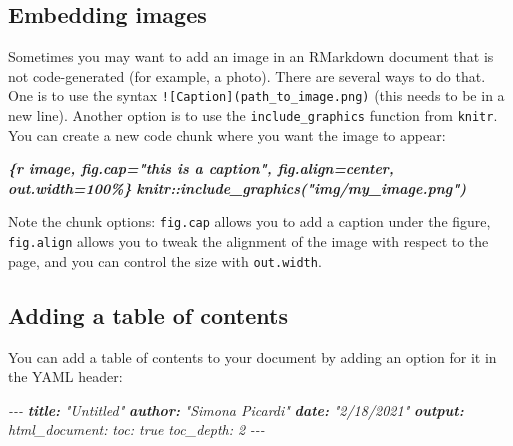 \documentclass[
]{book}
\newenvironment{Shaded}{\begin{snugshade}}{\end{snugshade}}
\newcommand{\AnnotationTok}[1]{\textcolor[rgb]{0.56,0.35,0.01}{\textbf{\textit{#1}}}}
\newcommand{\CommentTok}[1]{\textcolor[rgb]{0.56,0.35,0.01}{\textit{#1}}}
\newcommand{\InformationTok}[1]{\textcolor[rgb]{0.56,0.35,0.01}{\textbf{\textit{#1}}}}
\begin{document}
\hypertarget{embedding-images}{%
\subsection{Embedding images}\label{embedding-images}}

Sometimes you may want to add an image in an RMarkdown document that is not
code-generated (for example, a photo). There are several ways to do that. One is
to use the syntax \texttt{!{[}Caption{]}(path\_to\_image.png)} (this needs to be in a
new line). Another option is to use the \texttt{include\_graphics} function from \texttt{knitr}.
You can create a new code chunk where you want the image to appear:

\begin{Shaded}
\begin{Highlighting}[]
\InformationTok{\textasciigrave{}\textasciigrave{}\textasciigrave{}\{r image, fig.cap="this is a caption", fig.align=\textquotesingle{}center\textquotesingle{}, out.width=\textquotesingle{}100\%\textquotesingle{}\}}
\InformationTok{knitr::include\_graphics("img/my\_image.png")}
\InformationTok{\textasciigrave{}\textasciigrave{}\textasciigrave{}}
\end{Highlighting}
\end{Shaded}

Note the chunk options: \texttt{fig.cap} allows you to add a caption under the figure,
\texttt{fig.align} allows you to tweak the alignment of the image with respect to the
page, and you can control the size with \texttt{out.width}.

\hypertarget{adding-a-table-of-contents}{%
\subsection{Adding a table of contents}\label{adding-a-table-of-contents}}

You can add a table of contents to your document by adding an option for it in
the YAML header:

\begin{Shaded}
\begin{Highlighting}[]
\CommentTok{{-}{-}{-}}
\AnnotationTok{title:}\CommentTok{ "Untitled"}
\AnnotationTok{author:}\CommentTok{ "Simona Picardi"}
\AnnotationTok{date:}\CommentTok{ "2/18/2021"}
\AnnotationTok{output:}\CommentTok{ }
\CommentTok{  html\_document:}
\CommentTok{    toc: true}
\CommentTok{    toc\_depth: 2}
\CommentTok{{-}{-}{-}}
\end{Highlighting}
\end{Shaded}
\end{document}
